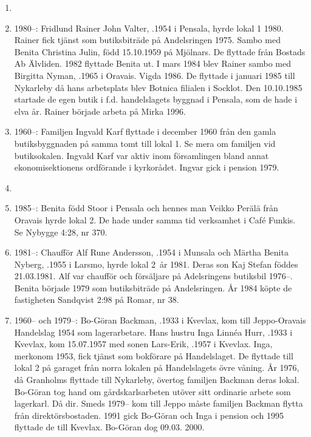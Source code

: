 \begin{enumerate}
  \item {}
  \item 1980--: Fridlund Rainer John Valter, .1954 i Pensala, hyrde lokal 1 1980. Rainer fick tjänst som butiksbiträde på Andelsringen 1975. Sambo med Benita Christina Julin, född 15.10.1959 på Mjölnars. De flyttade från Bostads Ab Älvliden. 1982 flyttade Benita ut. I mars 1984 blev Rainer sambo med Birgitta Nyman, .1965 i Oravais. Vigda 1986. De flyttade i januari 1985 till Nykarleby då hans arbetsplats blev Botnica filialen i Socklot. Den 10.10.1985 startade de egen butik i f.d. handelslagets byggnad i Pensala, som de hade i elva år. Rainer började arbeta på Mirka 1996.
  \item 1960--: Familjen Ingvald Karf flyttade i december 1960 från den gamla butiksbyggnaden på samma tomt till lokal 1. Se mera om familjen vid butiksokalen. Ingvald Karf var aktiv inom församlingen bland annat ekonomisektionens ordförande i kyrkorådet. Ingvar gick i pension 1979.
  \item {}
  \item 1985--: Benita född Stoor i Pensala och hennes man Veikko Perälä från Oravais hyrde lokal 2. De hade under samma tid verksamhet i Café Funkis. Se Nybygge 4:28, nr 370.
  \item 1981--: Chaufför Alf Rune Andersson, .1954 i Munsala och Märtha Benita Nyberg, .1955 i Larsmo, hyrde lokal 2 år 1981. Deras son Kaj Stefan föddes 21.03.1981. Alf var chaufför och försäljare på Adelsringens butiksbil 1976--. Benita började 1979 som butiksbiträde på Andelsringen. År 1984 köpte de fastigheten Sandqvist 2:98 på Romar, nr 38.
  \item 1960-- och 1979--: Bo-Göran Backman, .1933 i Kvevlax, kom till Jeppo-Oravais Handelslag 1954 som lagerarbetare. Hans hustru Inga Linnéa Hurr, .1933 i Kvevlax, kom 15.07.1957 med sonen Lars-Erik, .1957 i Kvevlax. Inga, merkonom 1953, fick tjänst som bokförare på Handelslaget. De flyttade till lokal 2 på garaget från norra lokalen på Handelslagets övre våning. År 1976, då Granholms flyttade till Nykarleby, övertog familjen Backman deras lokal. Bo-Göran tog hand om gårdskarlsarbeten utöver sitt ordinarie arbete som lagerkarl. Då dir. Smeds 1979-- kom till Jeppo måste familjen Backman flytta från direktörsbostaden. 1991 gick Bo-Göran och Inga i pension och 1995 flyttade de till Kvevlax. Bo-Göran dog 09.03. 2000.

\end{enumerate}
